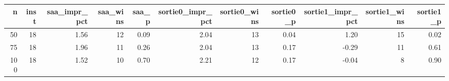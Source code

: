 \begin{tabular}{rrrrrrrrrrr}
\toprule
n & inst & saa_impr_pct & saa_wins & saa_p & sortie0_impr_pct & sortie0_wins & sortie0_p & sortie1_impr_pct & sortie1_wins & sortie1_p \\
\midrule
50 & 18 & 1.56 & 12 & 0.09 & 2.04 & 13 & 0.04 & 1.20 & 15 & 0.02 \\
75 & 18 & 1.96 & 11 & 0.26 & 2.04 & 13 & 0.17 & -0.29 & 11 & 0.61 \\
100 & 18 & 1.52 & 10 & 0.70 & 2.21 & 12 & 0.17 & -0.04 & 8 & 0.90 \\
\bottomrule
\end{tabular}
